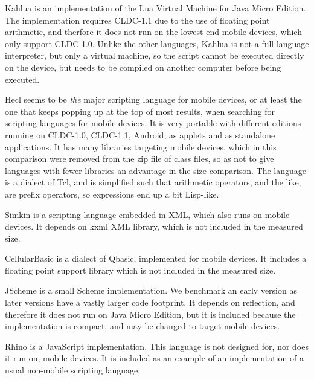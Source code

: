 \documentclass[11pt]{report}
\begin{document}
Kahlua \cite{kahlua} is an implementation of the Lua Virtual Machine for Java Micro Edition. 
The implementation requires CLDC-1.1 due to the use of floating point arithmetic, and therfore it does not run on the lowest-end mobile devices, which only support CLDC-1.0.
Unlike the other languages, Kahlua is not a full language interpreter, but only a virtual machine, so the script cannot be executed directly on the device, but needs to be compiled on another computer before being executed.

Hecl \cite{hecl} seems to be \emph{the} major scripting language for mobile devices, or at least the one that keeps popping up at the top of most results, when searching for scripting languages for mobile devices.
It is very portable with different editions running on CLDC-1.0, CLDC-1.1, Android, as applets and as standalone applications.
It has many libraries targeting mobile devices, which in this comparison were removed from the zip file of class files, so as not to give languages with fewer libraries an advantage in the size comparison.
The language is a dialect of Tcl, and is simplified such that arithmetic operators, and the like, are prefix operators, so expressions end up a bit Lisp-like.

Simkin \cite{simkin} is a scripting language embedded in XML, which also runs on mobile devices. It depends on kxml XML library, which is not included in the measured size. 

CellularBasic \cite{cellularbasic} is a dialect of Qbasic, implemented for mobile devices. 
It includes a floating point support library which is not included in the measured size. 

JScheme \cite{norvig-jscheme} is a small Scheme implementation. We benchmark an early version as later versions have a vastly larger code footprint. It depends on reflection, and therefore it does not run on Java Micro Edition, but it is included because the implementation is compact, and may be changed to target mobile devices.


Rhino \cite{rhino} is a JavaScript implementation. This language is not designed for, nor does it run on, mobile devices. It is included as an example of an implementation of a usual non-mobile scripting language.
\end{document}
